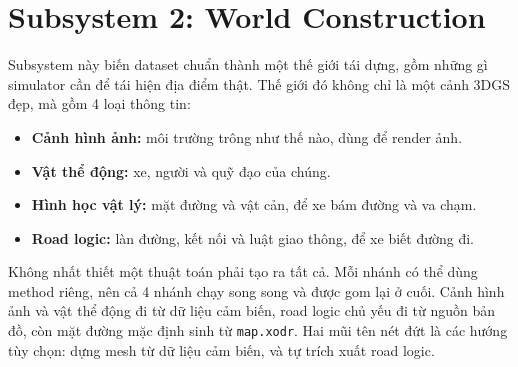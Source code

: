 \section{Subsystem 2: World Construction}

Subsystem này biến dataset chuẩn thành một thế giới tái dựng, gồm những gì simulator cần để tái hiện địa điểm thật.
Thế giới đó không chỉ là một cảnh 3DGS đẹp, mà gồm 4 loại thông tin:
\begin{itemize}
  \item \textbf{Cảnh hình ảnh:} môi trường trông như thế nào, dùng để render ảnh.
  \item \textbf{Vật thể động:} xe, người và quỹ đạo của chúng.
  \item \textbf{Hình học vật lý:} mặt đường và vật cản, để xe bám đường và va chạm.
  \item \textbf{Road logic:} làn đường, kết nối và luật giao thông, để xe biết đường đi.
\end{itemize}

Không nhất thiết một thuật toán phải tạo ra tất cả. Mỗi nhánh có thể dùng method riêng, nên cả 4 nhánh chạy song song và được gom lại ở cuối. Cảnh hình ảnh và vật thể động đi từ dữ liệu cảm biến, road logic chủ yếu đi từ nguồn bản đồ, còn mặt đường mặc định sinh từ \texttt{map.xodr}.
Hai mũi tên nét đứt là các hướng tùy chọn: dựng mesh từ dữ liệu cảm biến, và tự trích xuất road logic.

